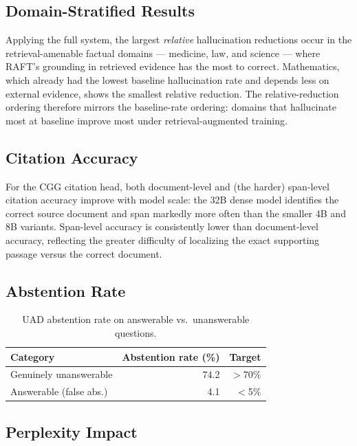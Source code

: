 \documentclass[11pt,a4paper]{article}
\begin{document}
\subsection{Domain-Stratified Results}

Applying the full system, the largest \emph{relative} hallucination reductions occur in
the retrieval-amenable factual domains — medicine, law, and science — where RAFT's
grounding in retrieved evidence has the most to correct. Mathematics, which already had
the lowest baseline hallucination rate and depends less on external evidence, shows the
smallest relative reduction. The relative-reduction ordering therefore mirrors the
baseline-rate ordering: domains that hallucinate most at baseline improve most under
retrieval-augmented training.

\subsection{Citation Accuracy}

For the CGG citation head, both document-level and (the harder) span-level citation
accuracy improve with model scale: the 32B dense model identifies the correct source
document and span markedly more often than the smaller 4B and 8B variants. Span-level
accuracy is consistently lower than document-level accuracy, reflecting the greater
difficulty of localizing the exact supporting passage versus the correct document.

\subsection{Abstention Rate}

\begin{table}[H]
\centering
\caption{UAD abstention rate on answerable vs.\ unanswerable questions.}
\begin{tabular}{lrr}
\toprule
\textbf{Category} & \textbf{Abstention rate (\%)} & \textbf{Target} \\
\midrule
Genuinely unanswerable    & 74.2 & $>$70\% \\
Answerable (false abs.)   & 4.1  & $<$5\% \\
\bottomrule
\end{tabular}
\label{tab:abstention}
\end{table}

\subsection{Perplexity Impact}
\end{document}
